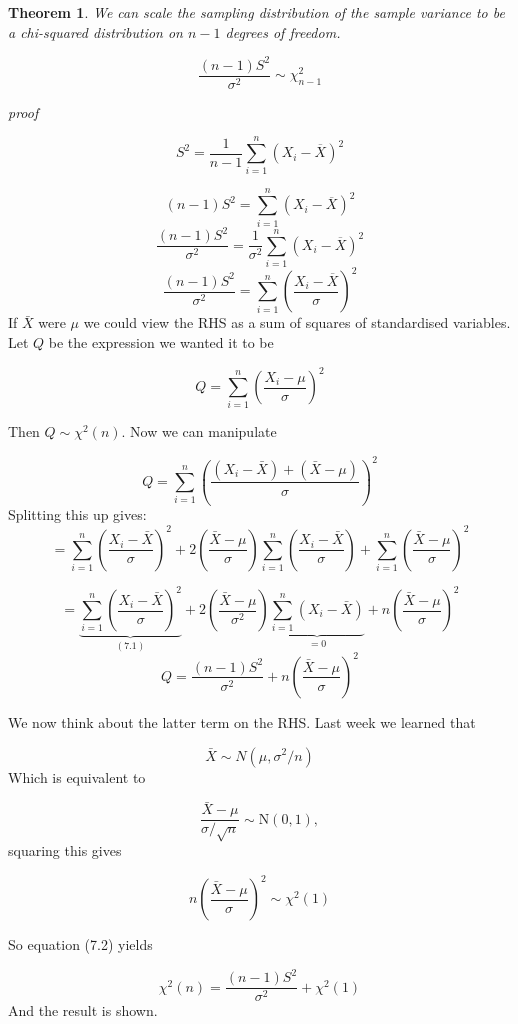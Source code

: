 \documentclass[
]{book}
\newtheorem{theorem}{Theorem}[chapter]
\theoremstyle{definition}
\theoremstyle{definition}
\theoremstyle{definition}
\theoremstyle{definition}
\theoremstyle{remark}
\begin{document}
\begin{theorem}
We can scale the sampling distribution of the sample variance to be a chi-squared distribution on \(n-1\) degrees of freedom.

\[\frac{(n-1)S^2}{\sigma^2} \sim\chi^2_{n-1}\]
\end{theorem}

\emph{proof}

\[S^2 =\frac{1}{n-1}\sum_{i=1}^n(X_i-\overline{X})^2 \]

\[(n-1)S^2 =\sum_{i=1}^n(X_i-\overline{X})^2 \]
\[\frac{(n-1)S^2}{\sigma^2} =\frac{1}{\sigma^2}\sum_{i=1}^n(X_i-\overline{X})^2 \]
\begin{equation}
\frac{(n-1)S^2}{\sigma^2} =\sum_{i=1}^n\left(\frac{X_i-\overline{X}}{\sigma}\right)^2
\label{eq:var}
\end{equation}
If \(\bar{X}\) were \(\mu\) we could view the RHS as a sum of squares of standardised variables. Let \(Q\) be the expression we wanted it to be

\[Q = \sum_{i=1}^n\left(\frac{X_i-\mu}{\sigma}\right)^2 \]

Then \(Q\sim \chi^2(n)\). Now we can manipulate

\[Q=\sum_{i=1}^n\left(\frac{(X_i- \bar{X}) + (\bar{X}-\mu)}{\sigma}\right)^2\]
Splitting this up gives:
\[=\sum_{i=1}^n\left(\frac{X_i - \bar{X}}{\sigma}\right)^2+2\left(\frac{\bar{X}-\mu}{\sigma}\right)\sum_{i=1}^n \left(\frac{X_i-\bar{X}}{\sigma}\right) + \sum_{i=1}^n\left(\frac{\bar{X} - \mu}{\sigma}\right)^2\]

\[=\underbrace{\sum_{i=1}^n\left(\frac{X_i - \bar{X}}{\sigma}\right)^2}_{(7.1)}+2\left(\frac{\bar{X}-\mu}{\sigma^2}\right)\underbrace{\sum_{i=1}^n \left(X_i-\bar{X}\right)}_{=0} + n\left(\frac{\bar{X} - \mu}{\sigma}\right)^2\]
\begin{equation}
Q =\frac{(n-1)S^2}{\sigma^2}+n\left(\frac{\bar{X} - \mu}{\sigma}\right)^2
\label{eq:Q}
\end{equation}

We now think about the latter term on the RHS. Last week we learned that

\[\bar{X}\sim N(\mu,\sigma^2/n)\]
Which is equivalent to

\[\frac{\bar{X}-\mu}{\sigma / \sqrt{n}} \sim \text{N}(0,1),\]
squaring this gives

\[n\left(\frac{\bar{X} - \mu}{\sigma}\right)^2 \sim\chi^2(1) \]

So equation (7.2) yields

\[\chi^2(n) = \frac{(n-1)S^2}{\sigma^2}+\chi^2(1)\]
And the result is shown.
\end{document}

